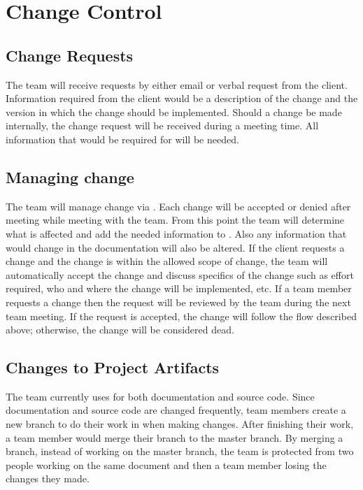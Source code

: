\section{Change Control}
\subsection{Change Requests}
The team will receive requests by either email or verbal request from the client.  Information required from the client would be a description of the change and the version in which the change should be implemented.  Should a change be made internally, the change request will be received during a meeting time.  All information that would be required for  will be needed.

\subsection{Managing change}
The team will manage change via .  Each change will be accepted or denied after meeting while meeting with the team.  From this point the team will determine what is affected and add the needed information to .  Also any information that would change in the documentation will also be altered.  If the client requests a change and the change is within the allowed scope of change, the team will automatically accept the change and discuss specifics of the change such as effort required, who and where the change will be implemented, etc. If a team member requests a change then the request will be reviewed by the team during the next team meeting.  If the request is accepted, the change will follow the flow described above; otherwise, the change will be considered dead.

\subsection{Changes to Project Artifacts}
The team currently uses  for both documentation and source code.  Since documentation and source code are changed frequently, team members create a new branch to do their work in when making changes.  After finishing their work, a team member would merge their branch to the master branch.  By merging a branch, instead of working on the master branch, the team is protected from two people working on the same document and then a team member losing the changes they made.
